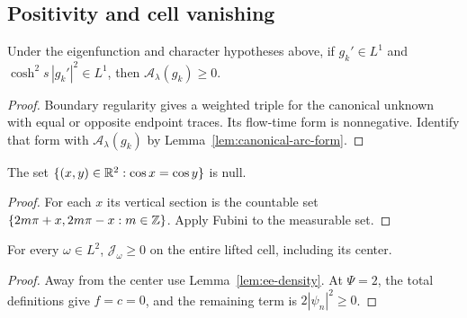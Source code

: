 \subsection{Positivity and cell vanishing}

\begin{lemma}
\label{lem:ee-canonical-arc-nonneg}
\leanok
Under the eigenfunction and character hypotheses above, if $g_k'\in L^1$ and
$\cosh^2s\,|g_k'|^2\in L^1$, then $\mathcal A_\lambda(g_k)\ge0$.
\end{lemma}

\begin{proof}
\leanok
Boundary regularity gives a weighted triple for the canonical unknown with equal or
opposite endpoint traces. Its flow-time form is nonnegative. Identify that form with
$\mathcal A_\lambda(g_k)$ by Lemma~\ref{lem:canonical-arc-form}.
\end{proof}

\begin{lemma}
\label{lem:cos-diagonal-null}
\leanok
The set $\{(x,y)\in\mathbb{R}^2:\cos x=\cos y\}$ is null.
\end{lemma}

\begin{proof}
\leanok
For each $x$ its vertical section is the countable set
$\{2m\pi+x,2m\pi-x:m\in\mathbb{Z}\}$. Apply Fubini to the measurable set.
\end{proof}

\begin{lemma}
\label{lem:ee-bulk-density-nonneg}
\leanok
For every $\omega\in L^2$, $\mathcal J_\omega\ge0$ on the entire lifted cell,
including its center.
\end{lemma}

\begin{proof}
\leanok
Away from the center use Lemma~\ref{lem:ee-density}. At $\Psi=2$, the total definitions
give $f=c=0$, and the remaining term is $2|\psi_n|^2\ge0$.
\end{proof}

